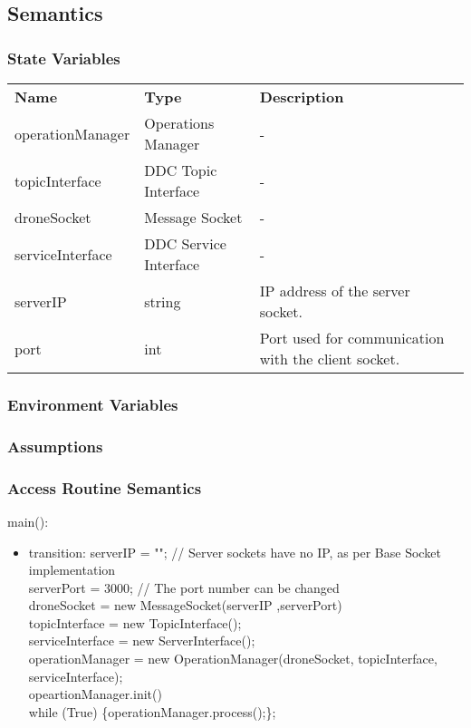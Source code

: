 \documentclass[12pt, titlepage]{article}
\begin{document}
\subsection{Semantics}
\subsubsection{State Variables}
\begin{center}
\begin{tabular}{p{3 cm} p{4cm} p{5cm} }
\hline
\textbf{Name} & \textbf{Type} & \textbf{Description}  \\
operationManager & Operations Manager & - \\
topicInterface & DDC Topic Interface & - \\
droneSocket & Message Socket & - \\
serviceInterface & DDC Service Interface & - \\
serverIP & string & IP address of the server socket. \\
port & int & Port used for communication with the client socket. \\
\hline
\hline
\end{tabular}
\end{center}
\subsubsection{Environment Variables}
\subsubsection{Assumptions}
\subsubsection{Access Routine Semantics}
\noindent main():
\begin{itemize}
\item transition: 
serverIP = ""; // Server sockets have no IP, as per Base Socket implementation \\
serverPort = 3000; // The port number can be changed \\
droneSocket = new MessageSocket(serverIP ,serverPort)\\
topicInterface = new TopicInterface();\\
serviceInterface = new ServerInterface();\\
operationManager = new OperationManager(droneSocket, topicInterface, serviceInterface);\\
	opeartionManager.init() \\
	while (True) \{operationManager.process();\};
\end{itemize}
\end{document}
